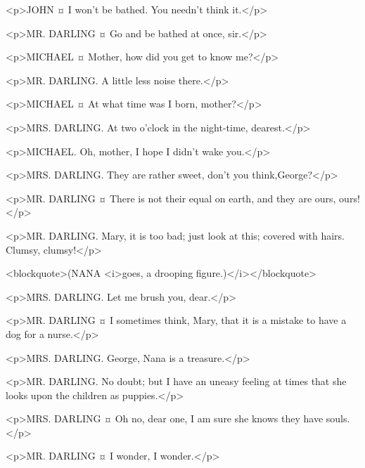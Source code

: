 <p>JOHN ¤
I won't be bathed. You needn't think it.</p>

<p>MR. DARLING ¤
Go and be bathed at once, sir.</p>


<p>MICHAEL ¤
Mother, how did you get to know me?</p>

<p>MR. DARLING. A little less noise there.</p>

<p>MICHAEL ¤
At what time was I born, mother?</p>

<p>MRS. DARLING. At two o'clock in the night-time, dearest.</p>

<p>MICHAEL. Oh, mother, I hope I didn't wake you.</p>

<p>MRS. DARLING. They are rather sweet, don't you think,George?</p>

<p>MR. DARLING ¤
There is not their equal on earth, and they are ours, ours!</p>


<p>MR. DARLING. Mary, it is too bad; just look at this; covered with hairs. Clumsy, clumsy!</p>

<blockquote>(NANA <i>goes, a drooping figure.)</i></blockquote>

<p>MRS. DARLING. Let me brush you, dear.</p>


<p>MR. DARLING ¤
I sometimes think, Mary, that it is a mistake to have a dog for a nurse.</p>

<p>MRS. DARLING. George, Nana is a treasure.</p>

<p>MR. DARLING. No doubt; but I have an uneasy feeling at times that she looks upon the children as puppies.</p>

<p>MRS. DARLING ¤
Oh no, dear one, I am sure she knows they have souls.</p>

<p>MR. DARLING ¤
I wonder, I wonder.</p>


